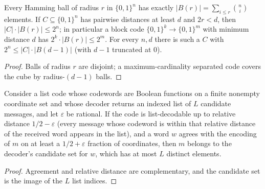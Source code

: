 \begin{theorem}
  \label{thm:meta-hamming-bounds}
  \leanok
  Every Hamming ball of radius $r$ in $\{0,1\}^n$ has exactly
  $|B(r)| = \sum_{i \le r}\binom{n}{i}$ elements. If $C \subseteq \{0,1\}^n$
  has pairwise distances at least $d$ and $2r < d$, then
  $|C| \cdot |B(r)| \le 2^n$; in particular a block code
  $\{0,1\}^k \to \{0,1\}^m$ with minimum distance $d$ has
  $2^k \cdot |B(r)| \le 2^m$. For every $n, d$ there is such a $C$ with
  $2^n \le |C| \cdot |B(d-1)|$ (with $d - 1$ truncated at $0$).
\end{theorem}
\begin{proof}
  \leanok
  Balls of radius $r$ are disjoint; a maximum-cardinality separated code covers
  the cube by radius-$(d-1)$ balls.
\end{proof}

\begin{theorem}
  \label{thm:meta-list-decoding}
  \leanok
  Consider a list code whose codewords are Boolean functions on a finite
  nonempty coordinate set and whose decoder returns an indexed list of $L$
  candidate messages, and let $\varepsilon$ be rational. If the code is
  list-decodable up to relative distance $1/2 - \varepsilon$ (every message
  whose codeword is within that relative distance of the received word
  appears in the list), and a word $w$ agrees with the encoding of $m$ on at
  least a $1/2 + \varepsilon$ fraction of coordinates, then $m$ belongs to the
  decoder's candidate set for $w$, which has at most $L$ distinct elements.
\end{theorem}
\begin{proof}
  \leanok
  Agreement and relative distance are complementary, and the candidate set is
  the image of the $L$ list indices.
\end{proof}


